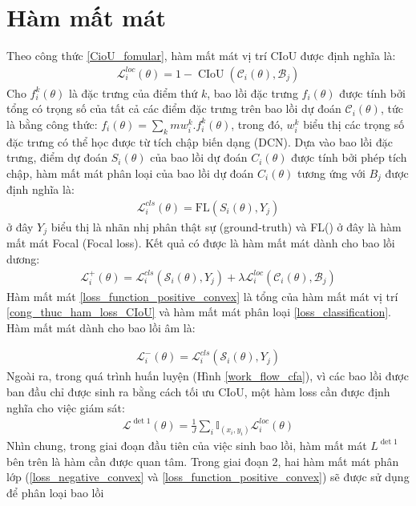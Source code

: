 \documentclass[12pt,a4paper,openany,oneside]{report}
\begin{document}
\section{Hàm mất mát}
Theo công thức \ref{CioU_fomular}, hàm mất mát vị trí CIoU được định nghĩa là:
\begin{align} \label{cong_thuc_ham_loss_CIoU}
	\mathcal{L}_i^{l o c}(\theta)=1-\operatorname{CIoU}\left(\mathcal{C}_i(\theta), \mathcal{B}_j\right)
\end{align}
Cho $f_i^{k}(\theta)$ là đặc trưng của điểm thứ $k$, bao lồi đặc trưng $f_i(\theta)$ được tính bởi tổng có trọng số của tất cả các điểm đặc trưng trên bao lồi dự đoán $\mathcal{C}_i(\theta)$, tức là bằng công thức: $f_i(\theta) = \sum_{k}m w_i^k.f_i^k(\theta)$, trong đó, $w_i^k$ biểu thị các trọng số đặc trưng có thể học được từ tích chập biến dạng (DCN). Dựa vào bao lồi đặc trưng, điểm dự đoán $S_i(\theta)$ của bao lồi dự đoán $C_i(\theta)$ được tính bởi phép tích chập, hàm mất mát phân loại của bao lồi dự đoán $C_i(\theta)$ tương ứng với $B_j$ được định nghĩa là:
\begin{align} \label{loss_classification}
	\mathcal{L}_i^{c l s}(\theta)=\mathrm{FL}\left(S_i(\theta), Y_j\right)
\end{align}
ở đây $Y_j$ biểu thị là nhãn nhị phân thật sự (ground-truth) và FL() ở đây là hàm mất mát Focal (Focal loss). Kết quả có được là hàm mất mát dành cho bao lồi dương: 
\begin{align} \label{loss_function_positive_convex}
	\mathcal{L}_i^{+}(\theta)=\mathcal{L}_i^{c l s}\left(\mathcal{S}_i(\theta), Y_j\right)+\lambda \mathcal{L}_i^{l o c}\left(\mathcal{C}_i(\theta), \mathcal{B}_j\right)
\end{align}
Hàm mất mát \ref{loss_function_positive_convex} là tổng của hàm mất mát vị trí \ref{cong_thuc_ham_loss_CIoU} và hàm mất mát phân loại \ref{loss_classification}.
Hàm mất mát dành cho bao lồi âm là:

\begin{align} \label{loss_negative_convex}
	\mathcal{L}_i^{-}(\theta)=\mathcal{L}_i^{c l s}\left(\mathcal{S}_i(\theta), Y_j\right)
\end{align}
Ngoài ra, trong quá trình huấn luyện (Hình \ref{work_flow_cfa}), vì các bao lồi được ban đầu chỉ được sinh ra bằng cách tối ưu CIoU, một hàm loss cần được định nghĩa cho việc giám sát:
\begin{align} \label{loss_det_1}
	\mathcal{L}^{\operatorname{det} 1}(\theta)=\frac{1}{J} \sum_i \mathbb{I}_{\left(x_i, y_i\right)} \mathcal{L}_i^{l o c}(\theta)
\end{align}
Nhìn chung, trong giai đoạn đầu tiên của việc sinh bao lồi, hàm mất mát $L^{\operatorname{det} 1}$ bên trên là hàm cần được quan tâm. Trong giai đoạn 2, hai hàm mất mát phân lớp (\ref{loss_negative_convex} và \ref{loss_function_positive_convex}) sẽ được sử dụng để phân loại bao lồi
\end{document}
